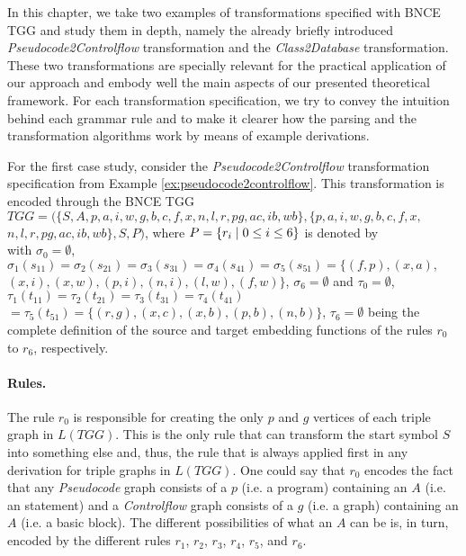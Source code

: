 In this chapter, we take two examples of transformations specified with BNCE TGG and study them in depth, namely the already briefly introduced \emph{Pseudocode2Controlflow} transformation and the \emph{Class2Database} transformation. These two transformations are specially relevant for the practical application of our approach and embody well the main aspects of our presented theoretical framework. For each transformation specification, we try to convey the intuition behind each grammar rule and to make it clearer how the parsing and the transformation algorithms work by means of example derivations.


For the first case study, consider the \emph{Pseudocode2Controlflow} transformation specification from Example \ref{ex:pseudocode2controlflow}. This transformation is encoded through the BNCE TGG $TGG = (\{S, A, p, a, i, w, g, b, c, f, x, n, l, r, pg, ac, ib, wb\}, \{p, a, i, w, g, b, c, f, x,$ $ n, l, r, pg, ac, ib, wb\}, S, P)$, where $P = \{r_i \; | \; 0 \le i \le 6\}$ is denoted by\\


\noindent
with $\sigma_0 = \emptyset$, $\sigma_1(s_{11}) = \sigma_2(s_{21}) = \sigma_3(s_{31}) = \sigma_4(s_{41}) =\sigma_5(s_{51}) = \{ (f,p), (x,a), $ $(x,i), (x,w), (p,i), (n,i), (l,w), (f,w) \}$, $\sigma_6 = \emptyset$ and $\tau_0 = \emptyset$, $\tau_1(t_{11}) = \tau_2(t_{21}) = \tau_3(t_{31}) = \tau_4(t_{41}) $ $= \tau_5(t_{51}) = \{ (r,g), (x,c), (x,b), (p,b), (n,b)\}$, $\tau_6 = \emptyset$ being the complete definition of the source and target embedding functions of the rules $r_0$ to $r_6$, respectively.

\paragraph*{Rules. } The rule $r_0$ is responsible for creating the only $p$ and $g$ vertices of each triple graph in $L(TGG)$. This is the only rule that can transform the start symbol $S$ into something else and, thus, the rule that is always applied first in any derivation for triple graphs in $L(TGG)$. One could say that $r_0$ encodes the fact that any \emph{Pseudocode} graph consists of a $p$ (i.e. a program) containing an $A$ (i.e. an statement) and a \emph{Controlflow} graph consists of a $g$ (i.e. a graph) containing an $A$ (i.e. a basic block). The different possibilities of what an $A$ can be is, in turn, encoded by the different rules $r_1$, $r_2$, $r_3$, $r_4$, $r_5$, and $r_6$.

